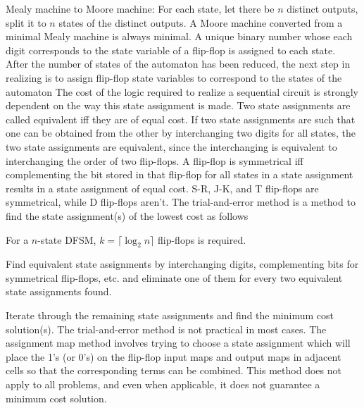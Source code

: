 \documentclass[a4paper,12pt]{report}
\begin{document}
\item Mealy machine to Moore machine: For each state, let there be $n$ distinct outputs, split it to $n$ states of the distinct outputs. A Moore machine converted from a minimal Mealy machine is always minimal.
\eit
{}
A unique binary number whose each digit corresponds to the state variable of a flip-flop is assigned to each state.
After the number of states of the automaton has been reduced, the next step in realizing is to assign flip-flop state variables to correspond to the states of the automaton The cost of the logic required to realize a sequential circuit is strongly dependent on the way this state assignment is made.
Two state assignments are called equivalent iff they are of equal cost.
If two state assignments are such that one can be obtained from the other by interchanging two digits for all states, the two state assignments are equivalent, since the interchanging is equivalent to interchanging the order of two flip-flops.
A flip-flop is symmetrical iff complementing the bit stored in that flip-flop for all states in a state assignment results in a state assignment of equal cost. S-R, J-K, and T flip-flops are symmetrical, while D flip-flops aren't.
The trial-and-error method is a method to find the state assignment(s) of the lowest cost as follows
\ben
\item For a $n$-state DFSM, $k=\lceil\log_2n\rceil$ flip-flops is required.
\item Find equivalent state assignments by interchanging digits, complementing bits for symmetrical flip-flops, etc. and eliminate one of them for every two equivalent state assignments found.
\item Iterate through the remaining state assignments and find the minimum cost solution(s).
\een
{}
The trial-and-error method is not practical in most cases. The assignment map method involves trying to choose a state assignment which will place the 1's (or 0's) on the flip-flop input maps and output maps in adjacent cells so that the corresponding terms can be combined. This method does not apply to all problems, and even when applicable, it does not guarantee a minimum cost solution.
\end{document}
